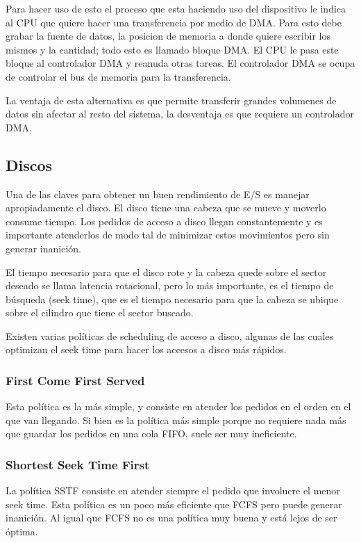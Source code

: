 \documentclass{article}
\begin{document}
Para hacer uso de esto el proceso que esta haciendo uso del dispositivo le indica al CPU que quiere hacer una transferencia por medio de DMA. Para esto debe grabar la fuente de datos, la posicion de memoria a donde quiere escribir los mismos y la cantidad; todo esto es llamado bloque DMA. El CPU le pasa este bloque al controlador DMA y reanuda otras tareas. El controlador DMA se ocupa de controlar el bus de memoria para la transferencia.

La ventaja de esta alternativa es que permite transferir grandes volumenes de datos sin afectar al resto del sistema, la desventaja es que requiere un controlador DMA.

\subsection{Discos}

Una de las claves para obtener un buen rendimiento de E/S es manejar apropiadamente el disco. El disco tiene una cabeza que se mueve y moverlo consume tiempo. Los pedidos de acceso a disco llegan constantemente y es importante atenderlos de modo tal de minimizar estos movimientos pero sin generar inanici\'on.

El tiempo necesario para que el disco rote y la cabeza quede sobre el sector deseado se llama latencia rotacional, pero lo m\'as importante, es el tiempo de b\'usqueda (seek time), que es el tiempo necesario para que la cabeza se ubique sobre el cilindro que tiene el sector buscado.

Existen varias pol\'iticas de scheduling de acceso a disco, algunas de las cuales optimizan el seek time para hacer los accesos a disco m\'as r\'apidos.

\subsubsection{First Come First Served}

Esta pol\'itica es la m\'as simple, y consiste en atender los pedidos en el orden en el que van llegando. Si bien es la pol\'itica m\'as simple porque no requiere nada m\'as que guardar los pedidos en una cola FIFO, suele ser muy ineficiente.

\subsubsection{Shortest Seek Time First}

La pol\'itica SSTF consiste en atender siempre el pedido que involucre el menor seek time. Esta pol\'itica es un poco m\'as eficiente que FCFS pero puede generar inanici\'on. Al igual que FCFS no es una pol\'itica muy buena y est\'a lejos de ser \'optima.
\end{document}
